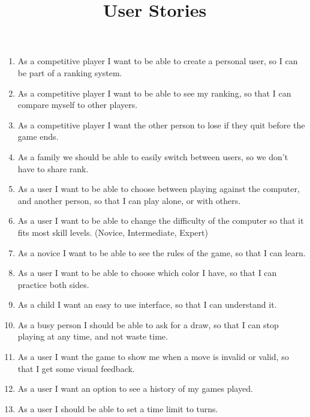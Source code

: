 \documentclass{article}
\title{User Stories}
\begin{document}
\date{}
\maketitle

\begin{enumerate}
	
\item	As a competitive player I want to be able to create a personal user, so I can be part of a ranking system.

\item	As a competitive player I want to be able to see my ranking, so that I can compare myself to other players.

\item	As a competitive player I want the other person to lose if they quit before the game ends.

\item	As a family we should be able to easily switch between users, so we don’t have to share rank.

\item	As a user I want to be able to choose between playing against the computer, and another person, so that I can play alone, or with 			others.

\item	As a user I want to be able to change the difficulty of the computer so that it fits most skill levels. 
		(Novice, Intermediate, Expert)

\item	As a novice I want to be able to see the rules of the game, so that I can learn.

\item	As a user I want to be able to choose which color I have, so that I can practice both sides. 

\item	As a child I want an easy to use interface, so that I can understand it.

\item	As a busy person I should be able to ask for a draw, so that I can stop playing at any time, and not waste time.

\item	As a user I want the game to show me when a move is invalid or valid, so that I get some visual feedback.

\item	As a user I want an option to see a history of my games played.

\item	As a user I should be able to set a time limit to turns. 


\end{enumerate}
\end{document}
